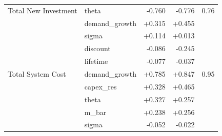 \begin{tabular}{@{}llrrr@{}}
\addlinespace
Total New Investment & theta & -0.760 & -0.776 & 0.76\\
 & demand_growth & +0.315 & +0.455 & \\
 & sigma & +0.114 & +0.013 & \\
 & discount & -0.086 & -0.245 & \\
 & lifetime & -0.077 & -0.037 & \\
\addlinespace
Total System Cost & demand_growth & +0.785 & +0.847 & 0.95\\
 & capex_res & +0.328 & +0.465 & \\
 & theta & +0.327 & +0.257 & \\
 & m_bar & +0.238 & +0.256 & \\
 & sigma & -0.052 & -0.022 & \\
\bottomrule
\end{tabular}
